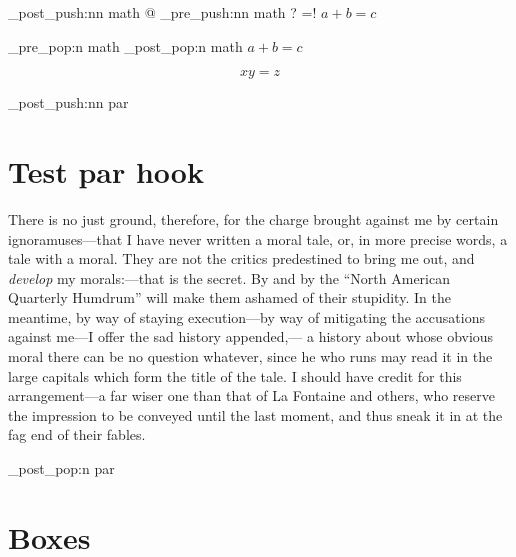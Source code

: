 \documentclass{article}
\begin{document}
\ExplSyntaxOn
\hook_post_push:nn {math} {@}
\hook_pre_push:nn {math} {?}
\everymath={!}
$a+b=c$\par

\hook_pre_pop:n {math}
\hook_post_pop:n {math}
$a+b=c$
\ExplSyntaxOff

\[xy=z\]

\ExplSyntaxOn
\hook_post_push:nn {par} {\makebox[0pt][r]{\P[\space]}}
\ExplSyntaxOff

\section{Test par hook}
There is no just ground, therefore, for the charge brought against me by
certain ignoramuses---that I have never written a moral tale, or, in more
precise words, a tale with a moral. They are not the critics predestined
to bring me out, and \emph{develop} my morals:---that is the secret. By and by
the ``North American Quarterly Humdrum'' will make them ashamed of their
stupidity. In the meantime, by way of staying execution---by way of
mitigating the accusations against me---I offer the sad history appended,---
a history about whose obvious moral there can be no question whatever,
since he who runs may read it in the large capitals which form the title
of the tale. I should have credit for this arrangement---a far wiser one
than that of La Fontaine and others, who reserve the impression to be
conveyed until the last moment, and thus sneak it in at the fag end of
their fables.

\ExplSyntaxOn
\hook_post_pop:n {par}
\ExplSyntaxOff

\section{Boxes}

\par
\begingroup
\ExplSyntaxOn
{}
\ExplSyntaxOff
\endgroup
\end{document}
